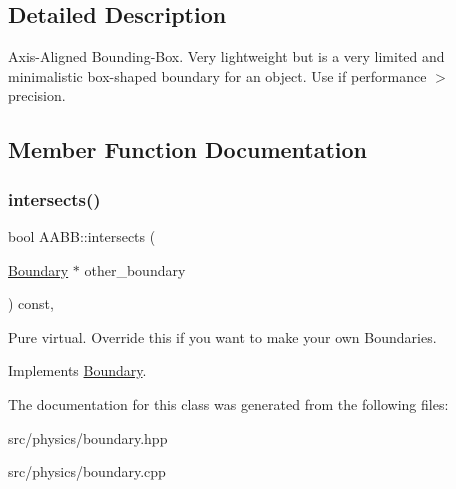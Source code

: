 \subsection{Detailed Description}
Axis-\/\+Aligned Bounding-\/\+Box. Very lightweight but is a very limited and minimalistic box-\/shaped boundary for an object. Use if performance $>$ precision. 

\subsection{Member Function Documentation}
\mbox{\label{class_a_a_b_b_ab427a4455732a16802103e06ed4af02a}} 
\subsubsection{\texorpdfstring{intersects()}{intersects()}}
{\footnotesize\ttfamily bool A\+A\+B\+B\+::intersects (\begin{DoxyParamCaption}\item[{\mbox{\hyperlink{class_boundary}{Boundary}} $\ast$}]{other\+\_\+boundary }\end{DoxyParamCaption}) const\hspace{0.3cm}{\ttfamily [override]}, {\ttfamily [virtual]}}

Pure virtual. Override this if you want to make your own Boundaries. 

Implements \mbox{\hyperlink{class_boundary_a364909bdfa4a4945f974c34a39e198cc}{Boundary}}.



The documentation for this class was generated from the following files\+:\begin{DoxyCompactItemize}
\item 
src/physics/boundary.\+hpp\item 
src/physics/boundary.\+cpp\end{DoxyCompactItemize}

